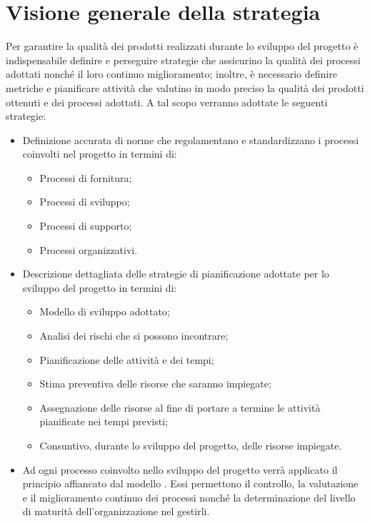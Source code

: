 \documentclass[../PianoDiQualifica.tex]{subfiles}
\begin{document}
	\section{Visione generale della strategia}
		Per garantire la qualità dei prodotti realizzati durante lo sviluppo del
		progetto è indispensabile definire e perseguire strategie che assicurino la
		qualità dei processi adottati nonché il loro continuo miglioramento;
		inoltre, è necessario definire metriche e pianificare attività che valutino in
		modo preciso la qualità dei prodotti ottenuti e dei processi adottati. A tal
		scopo verranno adottate le seguenti strategie:
		\begin{itemize}
			\item Definizione accurata di norme che regolamentano e standardizzano i
			processi coinvolti nel progetto in termini di:
				\begin{itemize}
					\item Processi di fornitura;
					\item Processi di sviluppo;
					\item Processi di supporto;
					\item Processi organizzativi.
				\end{itemize}
			\item Descrizione dettagliata delle strategie di pianificazione adottate
			per lo sviluppo del progetto in termini di:
				\begin{itemize}
					\item Modello di sviluppo adottato;
					\item Analisi dei rischi che si possono incontrare;
					\item Pianificazione delle attività e dei tempi;
					\item Stima preventiva delle risorse che saranno impiegate;
					\item Assegnazione delle risorse al fine di portare a termine le
					attività pianificate nei tempi previsti;
					\item Consuntivo, durante lo sviluppo del progetto, delle risorse
					impiegate.
				\end{itemize}
			\item Ad ogni processo coinvolto nello sviluppo del progetto verrà applicato
			il principio  affiancato dal modello . Essi permettono il
			controllo, la valutazione e il miglioramento continuo dei processi nonché
			la determinazione del livello di maturità dell'organizzazione nel gestirli.
		\end{itemize}
\end{document}
